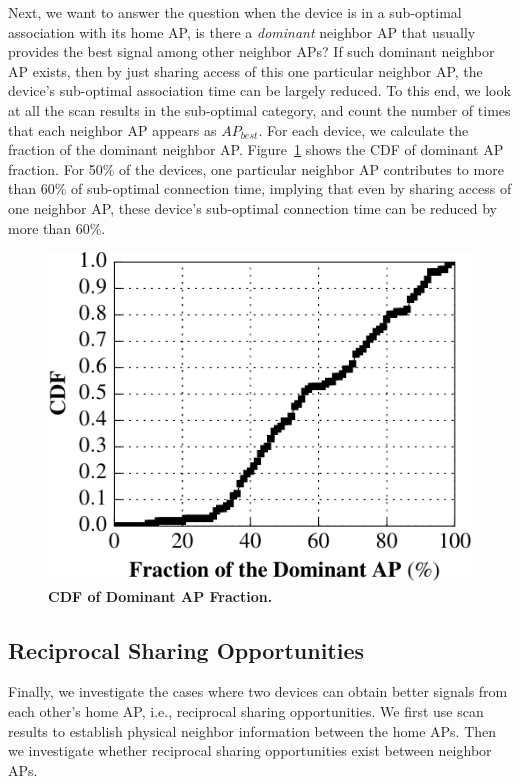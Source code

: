 Next, we want to answer the question when the device is in a sub-optimal association
with its home AP, is there a \textit{dominant} neighbor AP that
usually provides the best signal among other neighbor APs? If such dominant
neighbor AP exists, then by just sharing access of this one particular neighbor
AP, the device's sub-optimal association time can be largely reduced. To this
end, we look at all the scan results in the sub-optimal category, and count the
number of times that each neighbor AP appears as $AP_{best}$. For each device,
we calculate the fraction of the dominant neighbor AP. Figure~\ref{fig:dominantap}
shows the CDF of dominant AP fraction. For 50\% of the devices, one particular
neighbor AP contributes to more than 60\% of sub-optimal connection time,
implying that even by sharing \wifi{} access of one neighbor AP, these device's
sub-optimal connection time can be reduced by more than 60\%.

\begin{figure}[t]
  \centering
  \includegraphics[width=\columnwidth]{./figures/BetterNeighborAPFigure.pdf}
  \caption{\textbf{CDF of Dominant AP Fraction.}}
  \label{fig:dominantap}
\end{figure}


\subsection{Reciprocal Sharing Opportunities}
\label{subsec:reciprocal}

Finally, we investigate the cases where two devices can obtain better signals
from each other's home AP, i.e., reciprocal sharing opportunities. We first use
scan results to establish physical neighbor information between the home APs.
Then we investigate whether reciprocal sharing opportunities exist between
neighbor APs.

